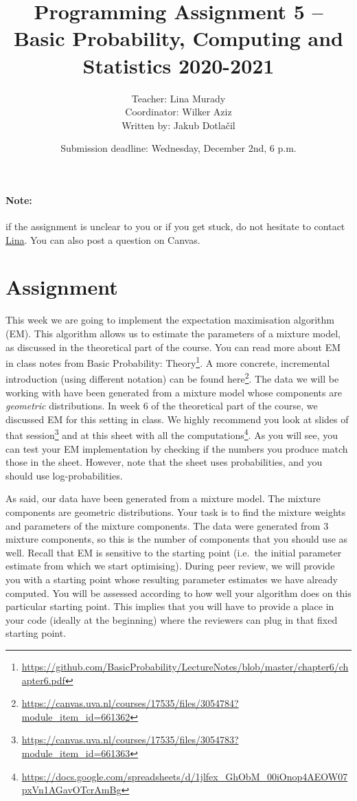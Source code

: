 \documentclass[11pt, a4paper]{article}
\title{Programming Assignment 5 -- Basic Probability, Computing and Statistics 2020-2021}
\author{Teacher: Lina Murady \\
  Coordinator: Wilker Aziz \\
  Written by: Jakub Dotla\v{c}il}
\date{Submission deadline: Wednesday, December 2nd, 6 p.m.}
\newcommand{\link}[1]{\footnote{\color{blue}\href{#1}{#1}}}
\begin{document}
\maketitle

\paragraph{Note:} if the assignment is unclear to you or if you get stuck, do not hesitate to contact \href{mailto:l.murady@uva.nl}{Lina}. You can also post a question on Canvas.

\section{Assignment}

This week we are going to implement the expectation maximisation algorithm (EM). 
This algorithm allows us to estimate the parameters of a mixture model, as discussed in the theoretical part of the course.
You can read more about EM in class notes from Basic Probability: Theory\link{https://github.com/BasicProbability/LectureNotes/blob/master/chapter6/chapter6.pdf}. 
A more concrete, incremental introduction (using different notation) can be found here\footnote{\href{https://canvas.uva.nl/courses/17535/files/3054784?module_item_id=661362}{https://canvas.uva.nl/courses/17535/files/3054784?module\_item\_id=661362}}.
The data we will be working with have been generated from a mixture model whose components are \emph{geometric} distributions.
In week 6 of the theoretical part of the course, we discussed EM for this setting in class. 
We highly recommend you look at slides of that session\footnote{\href{https://canvas.uva.nl/courses/17535/files/3054783?module_item_id=661363}{https://canvas.uva.nl/courses/17535/files/3054783?module\_item\_id=661363}} and  at this sheet with all the computations\footnote{\href{https://docs.google.com/spreadsheets/d/1jlfex_GhObM_00iOnop4AEOW07pxVn1AGavOTcrAmBg}{https://docs.google.com/spreadsheets/d/1jlfex\_GhObM\_00iOnop4AEOW07pxVn1AGavOTcrAmBg}}.
As you will see, you can test your EM implementation by checking if the numbers you produce match those in the sheet. 
However, note that the sheet uses probabilities, and you should use log-probabilities.



As said, our data have been generated from a mixture model. 
 The mixture components are geometric distributions. 
 Your task is to find the mixture weights and parameters of the mixture components. 
 The data were generated from 3 mixture components, so this is the number of components that you should use as well. 
Recall that EM is sensitive to the starting point (i.e.\ the initial parameter estimate from which we start optimising). During peer review, we will
provide you with a starting point whose resulting parameter estimates we have already computed. You will be assessed according to how well your
algorithm does on this particular starting point. This implies that you will have to provide a place in your code (ideally at the beginning) where
the reviewers can plug in that fixed starting point.
\end{document}
